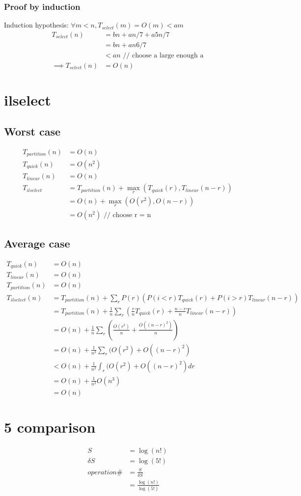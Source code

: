 \documentclass{article}
\begin{document}
\subsubsection{Proof by induction}
Induction hypothesis: $\forall m < n, T_{select}(m) = O(m) < am$
\begin{align*}
T_{select}(n)
&= bn + an/7 + a5n/7\\
&= bn + an6/7\\
&< an \text{ // choose a large enough a}\\
\implies T_{select}(n) &= O(n)
\end{align*}
\section{ilselect}
\subsection{Worst case}
\begin{align*}
T_{partition}(n) &= O(n)\\
T_{quick}(n) &= O(n^2)\\
T_{linear}(n) &= O(n)\\
T_{ilselect}
&= T_{partition}(n) + \max_r (T_{quick}(r), T_{linear}(n-r))\\
&= O(n) + \max_r (O(r^2), O(n-r))\\
&= O(n^2) \text{ // choose r = n}
\end{align*}
\subsection{Average case}
\begin{align*}
T_{quick}(n) &= O(n)\\
T_{linear}(n) &= O(n)\\
T_{partition}(n) &= O(n)\\
T_{ilselect}(n)
&= T_{partition}(n) + \sum_r P(r) (P(i < r)T_{quick}(r) + P(i > r)
T_{linear}(n-r))\\
&= T_{partition}(n) + \frac{1}{n} \sum_r (\frac{r}{n}T_{quick}(r) +
\frac{n-r}{n}T_{linear}(n-r))\\
&= O(n) + \frac{1}{n} \sum_r (\frac{O(r^2)}{n} + \frac{O((n-r)^2)}{n})\\
&= O(n) + \frac{1}{n^2} \sum_r (O(r^2) + O((n-r)^2)\\
&< O(n) + \frac{1}{n^2} \int_r (O(r^2) + O((n-r)^2)dr\\
&= O(n) + \frac{1}{n^2} O(n^3)\\
&= O(n)
\end{align*}
\section{5 comparison}
\begin{align*}
S &= \log(n!)\\
\delta S &= \log(5!)\\
operation\#
&= \frac{S}{\delta S}\\
&= \frac{\log(n!)}{\log(5!)}
\end{align*}
\end{document}
